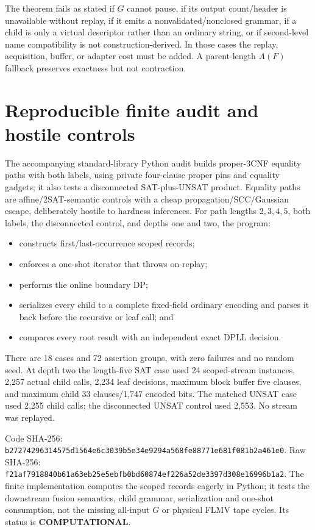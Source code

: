 \documentclass[11pt]{article}
\begin{document}
The theorem fails as stated if \(G\) cannot pause, if its output count/header
is unavailable without replay, if it emits a nonvalidated/nonclosed grammar,
if a child is only a virtual descriptor rather than an ordinary string, or
if second-level name compatibility is not construction-derived.  In those
cases the replay, acquisition, buffer, or adapter cost must be added.  A
parent-length \(A(F)\) fallback preserves exactness but not contraction.

\section{Reproducible finite audit and hostile controls}
The accompanying standard-library Python audit builds proper-3CNF equality
paths with both labels, using private four-clause proper pins and equality
gadgets; it also tests a disconnected SAT-plus-UNSAT product.  Equality paths
are affine/2SAT-semantic controls with a cheap propagation/SCC/Gaussian
escape, deliberately hostile to hardness inferences.  For path lengths
\(2,3,4,5\), both labels, the disconnected control, and depths one and two,
the program:
\begin{itemize}
\item constructs first/last-occurrence scoped records;
\item enforces a one-shot iterator that throws on replay;
\item performs the online boundary DP;
\item serializes every child to a complete fixed-field ordinary encoding and
parses it back before the recursive or leaf call; and
\item compares every root result with an independent exact DPLL decision.
\end{itemize}
There are 18 cases and 72 assertion groups, with zero failures and no random
seed.  At depth two the length-five SAT case used 24 scoped-stream instances,
2,257 actual child calls, 2,234 leaf decisions, maximum block buffer five
clauses, and maximum child 33 clauses/1,747 encoded bits.  The matched UNSAT
case used 2,255 child calls; the disconnected UNSAT control used 2,553.
No stream was replayed.

Code SHA-256:
\texttt{b27274296314575d1564e6c3039b5e34e9294a568fe88771e681f081b2a461e0}.
Raw SHA-256:
\texttt{f21af7918840b61a63eb25e5ebfb0bd60874ef226a52de3397d308e16996b1a2}.
The finite implementation computes the scoped records eagerly in Python; it
tests the downstream fusion semantics, child grammar, serialization and
one-shot consumption, not the missing all-input \(G\) or physical FLMV tape
cycles.  Its status is \textbf{COMPUTATIONAL}.
\end{document}
